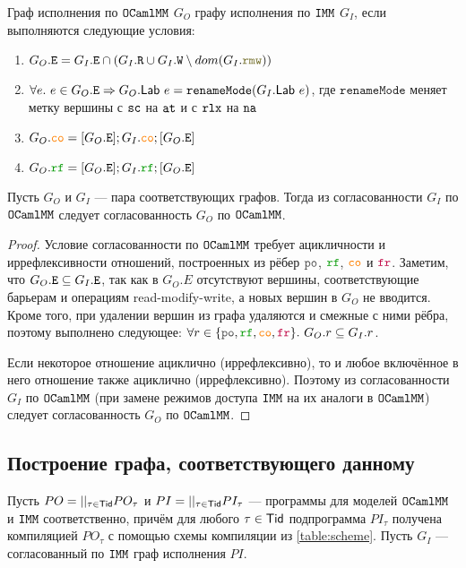 \begin{defn}\label{def:compiled}
  Граф исполнения по $\mathtt{OCaml}\allowbreak \mathtt{MM}$ $G_O$  графу исполнения по $\mathtt{IMM}$ $G_I$, если выполняются следующие условия:
  \begin{enumerate}
  \item $G_O.\lE = G_I.\lE \cap (G_I.\lR \cup G_I.\lW \setminus dom(G_I.\lRMW))$
  \item $\forall e.\ e \in G_O.{\mathtt{E}} \Rightarrow G_O.\mathsf{Lab}\ e = \mathtt{renameMode}(G_I.\mathsf{Lab}\ e)$, где $\mathtt{renameMode}$ меняет метку вершины с ${\mathtt{sc}}$ на ${\mathtt{at}}$ и с $\mathtt{rlx}$ на ${\mathtt{na}}$
  \item $G_O.\lCO = [G_O.\lE]; G_I.\lCO; [G_O.\lE]$
  \item $G_O.\lRF = [G_O.\lE]; G_I.\lRF; [G_O.\lE]$
  \end{enumerate}
\end{defn}

\begin{thrm} \label{graph-replacement}
  Пусть $G_O$ и $G_I$ --- пара соответствующих графов. Тогда из согласованности $G_I$ по $\mathtt{OCaml}\allowbreak \mathtt{MM}$ следует согласованность $G_O$ по $\mathtt{OCaml}\allowbreak \mathtt{MM}$. 
\end{thrm}
\begin{proof}
  Условие согласованности по $\mathtt{OCaml}\allowbreak \mathtt{MM}$ требует ацикличности и иррефлексивности отношений, построенных из рёбер $\lPO$, $\lRF$, $\lCO$ и $\lFR$. Заметим, что $G_O.{\mathtt{E}} \subseteq G_I.{\mathtt{E}}$, так как в $G_O.E$ отсутствуют вершины, соответствующие барьерам и операциям read-modify-write, а новых вершин в $G_O$ не вводится. Кроме того, при удалении вершин из графа удаляются и смежные с ними рёбра, поэтому выполнено следующее: $\forall r \in \set{\lPO, \lRF, \lCO, \lFR}.\ G_O.r \subseteq G_I.r$.

  Если некоторое отношение ациклично (иррефлексивно), то и любое включённое в него отношение также ациклично (иррефлексивно). Поэтому из согласованности $G_I$ по $\mathtt{OCaml}\allowbreak \mathtt{MM}$ (при замене режимов доступа $\mathtt{IMM}$ на их аналоги в $\mathtt{OCaml}\allowbreak \mathtt{MM}$) следует согласованность $G_O$ по $\mathtt{OCaml}\allowbreak \mathtt{MM}$.
\end{proof}

\subsection{Построение графа, соответствующего данному}

Пусть $PO=||_{\tau\in \mathsf{Tid}} PO_\tau$ и $PI=||_{\tau\in \mathsf{Tid}} PI_\tau$ --- программы для моделей $\mathtt{OCaml}\allowbreak \mathtt{MM}$ и $\mathtt{IMM}$ соответственно, причём для любого $\tau \in \mathsf{Tid}$ подпрограмма $PI_\tau$ получена компиляцией $PO_\tau$ с помощью схемы компиляции из \cref{table:scheme}. Пусть $G_I$ --- согласованный по $\mathtt{IMM}$ граф исполнения $PI$.

